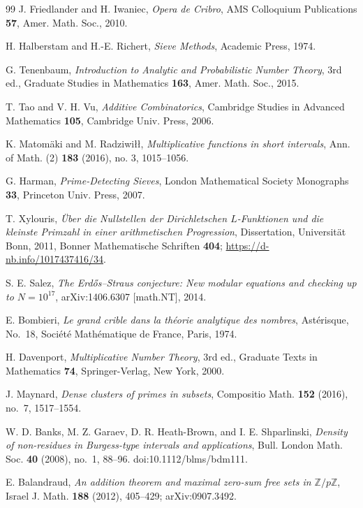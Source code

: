 \documentclass[11pt, a4paper]{article}
\theoremstyle{plain}
\theoremstyle{definition}
\begin{document}
\begin{thebibliography}{99}
 J. Friedlander and H. Iwaniec, \textit{Opera de Cribro}, AMS Colloquium Publications \textbf{57}, Amer. Math. Soc., 2010.

 H. Halberstam and H.-E. Richert, \textit{Sieve Methods}, Academic Press, 1974.

 G. Tenenbaum, \textit{Introduction to Analytic and Probabilistic Number Theory}, 3rd ed., Graduate Studies in Mathematics \textbf{163}, Amer. Math. Soc., 2015.

 T. Tao and V. H. Vu, \textit{Additive Combinatorics}, Cambridge Studies in Advanced Mathematics \textbf{105}, Cambridge Univ. Press, 2006.

 K. Matom\"{a}ki and M. Radziwi\l\l, \textit{Multiplicative functions in short intervals}, Ann. of Math. (2) \textbf{183} (2016), no. 3, 1015--1056.

 G. Harman, \textit{Prime-Detecting Sieves}, London Mathematical Society Monographs \textbf{33}, Princeton Univ. Press, 2007.

 T. Xylouris, \textit{\"{U}ber die Nullstellen der Dirichletschen $L$-Funktionen und die kleinste Primzahl in einer arithmetischen Progression}, Dissertation, Universit\"{a}t Bonn, 2011, Bonner Mathematische Schriften \textbf{404}; \url{https://d-nb.info/1017437416/34}.

 S. E. Salez, \textit{The Erd\H{o}s--Straus conjecture: New modular equations and checking up to $N=10^{17}$}, arXiv:1406.6307 [math.NT], 2014.

 E. Bombieri, \textit{Le grand crible dans la th\'{e}orie analytique des nombres}, Ast\'{e}risque, No.~18, Soci\'{e}t\'{e} Math\'{e}matique de France, Paris, 1974.

 H. Davenport, \textit{Multiplicative Number Theory}, 3rd ed., Graduate Texts in Mathematics \textbf{74}, Springer-Verlag, New York, 2000.

 J. Maynard, \textit{Dense clusters of primes in subsets}, Compositio Math. \textbf{152} (2016), no.~7, 1517--1554.

 W. D. Banks, M. Z. Garaev, D. R. Heath-Brown, and I. E. Shparlinski, \textit{Density of non-residues in Burgess-type intervals and applications}, Bull. London Math. Soc. \textbf{40} (2008), no.~1, 88--96. doi:10.1112/blms/bdm111.

 E. Balandraud, \textit{An addition theorem and maximal zero-sum free sets in $\mathbb{Z}/p\mathbb{Z}$}, Israel J. Math. \textbf{188} (2012), 405--429; arXiv:0907.3492.


\end{thebibliography}
\end{document}
